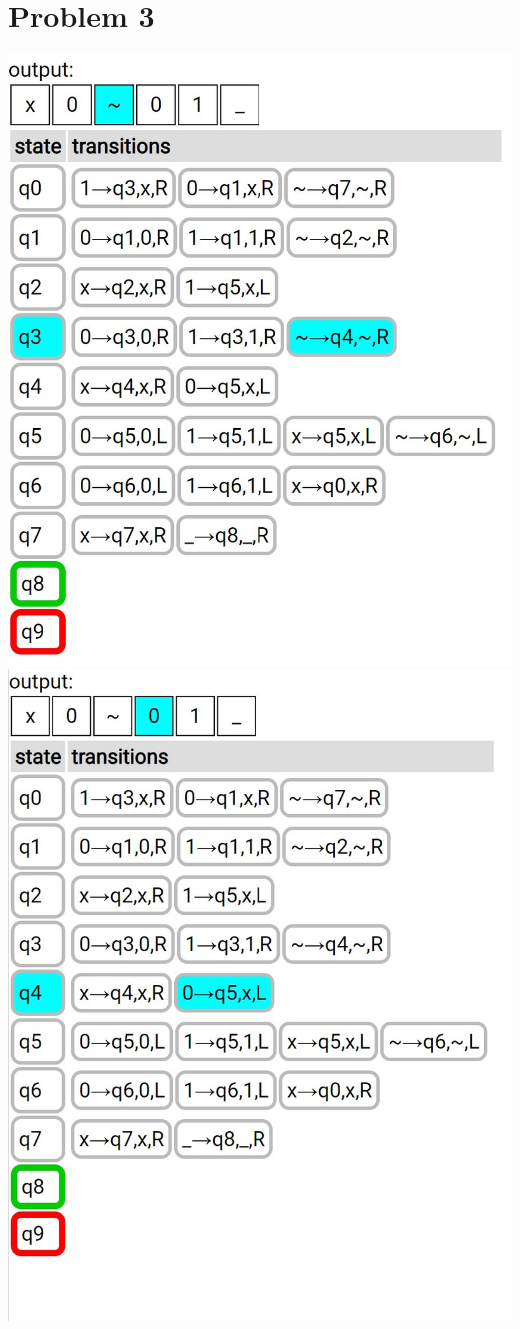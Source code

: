 \documentclass{article}
\newenvironment{problem}[1]{
  \nobreak\section*{Problem #1}
}{}
\begin{document}
\begin{problem}{3}
\begin{center}
      \includegraphics[scale=0.5]{images/2.jpg}
      \includegraphics[scale=0.5]{images/3.jpg}

\end{center}
\end{problem}
\end{document}
